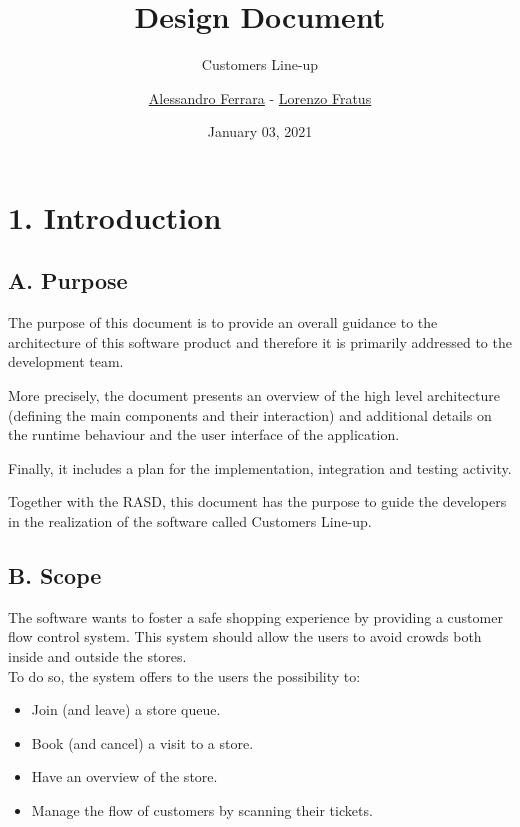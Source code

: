 
\graphicspath{ {assets/dd/} }

\title{Design Document}
\subtitle{Customers Line-up}
\author{\href{https://github.com/ferrohd}{Alessandro Ferrara} -
\href{https://github.com/lorenzofratus}{Lorenzo Fratus}}
\date{January 03, 2021}



\maketitle

\tableofcontents

\chapter{1. Introduction}

\section{A. Purpose}

The purpose of this document is to provide an overall guidance to the architecture of this software product and therefore it is primarily addressed to the development team.

More precisely, the document presents an overview of the high level architecture (defining the main components and their interaction) and additional details on the runtime behaviour and the user interface of the application.

Finally, it includes a plan for the implementation, integration and testing activity.

Together with the RASD, this document has the purpose to guide the developers in the realization of the software called Customers Line-up.

\section{B. Scope}

The software wants to foster a safe shopping experience by providing a customer flow control system. This system should allow the users to avoid crowds both inside and outside the stores.\\
To do so, the system offers to the users the possibility to:

\begin{itemize}
    \item Join (and leave) a store queue.
    \item Book (and cancel) a visit to a store.
    \item Have an overview of the store.
    \item Manage the flow of customers by scanning their tickets.
\end{itemize}

